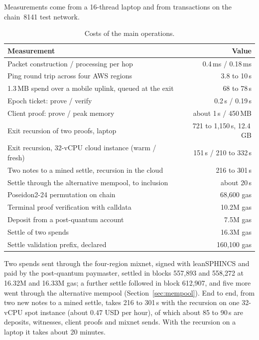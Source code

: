 \documentclass[11pt,a4paper]{article}
\begin{document}
Measurements come from a 16-thread laptop and from transactions on the chain~8141 test network.

\begin{table}[ht]
\centering\small
\begin{tabular}{@{}lr@{}}
\toprule
Measurement & Value \\
\midrule
Packet construction / processing per hop & 0.4\,ms / 0.18\,ms \\
Ping round trip across four AWS regions & 3.8 to 10\,s \\
1.3\,MB spend over a mobile uplink, queued at the exit & 68 to 78\,s \\
Epoch ticket: prove / verify & 0.2\,s / 0.19\,s \\
Client proof: prove / peak memory & about 1\,s / 450\,MB \\
Exit recursion of two proofs, laptop & 721 to 1,150\,s, 12.4\,GB \\
Exit recursion, 32-vCPU cloud instance (warm / fresh) & 151\,s / 210 to 332\,s \\
Two notes to a mined settle, recursion in the cloud & 216 to 301\,s \\
Settle through the alternative mempool, to inclusion & about 20\,s \\
\midrule
Poseidon2-24 permutation on chain & 68,600 gas \\
Terminal proof verification with calldata & 10.2M gas \\
Deposit from a post-quantum account & 7.5M gas \\
Settle of two spends & 16.3M gas \\
Settle validation prefix, declared & 160,100 gas \\
\bottomrule
\end{tabular}
\caption{Costs of the main operations.}
\end{table}

\noindent Two spends sent through the four-region mixnet, signed with leanSPHINCS and paid by the
post-quantum paymaster, settled in blocks 557,893 and 558,272 at 16.32M and 16.33M gas; a further settle
followed in block 612,907, and five more went through the alternative mempool
(Section~\ref{sec:mempool}). End to end, from two new notes to a mined settle, takes 216 to 301\,s with
the recursion on one 32-vCPU spot instance (about 0.47 USD per hour), of which about 85 to 90\,s are
deposits, witnesses, client proofs and mixnet sends. With the recursion on a laptop it takes about
20 minutes.
\end{document}
